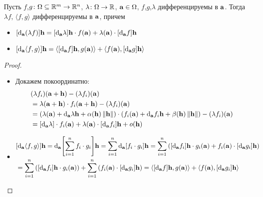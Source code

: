 \begin{theorem}

    Пусть $f$,$g \colon \Omega \subseteq \mathbb{R}^m \to \mathbb{R}^n$, $\lambda \colon \Omega \to
    \mathbb{R}$, $\mathbf{a} \in \Omega$, $f$,$g$,$\lambda$ дифференцируемы в $\mathbf{a}$. Тогда
    $\lambda f$, $\langle f, g \rangle$ дифференцируемы в $\mathbf{a}$, причем
    \begin{itemize}
        \item $[\mathrm{d}_{\mathbf{a}}{(\lambda f)}]\mathbf{h} =
        [\mathrm{d}_{\mathbf{a}}{\lambda}]\mathbf{h} \cdot f(\mathbf{a}) + \lambda(\mathbf{a}) \cdot
        [\mathrm{d}_{\mathbf{a}}{f}]\mathbf{h}$
        \item $[\mathrm{d}_{\mathbf{a}}{\langle f, g \rangle}]\mathbf{h} =
        \langle [\mathrm{d}_{\mathbf{a}}{f}]\mathbf{h}, g(\mathbf{a}) \rangle
        + \langle f(\mathbf{a}), [\mathrm{d}_{\mathbf{a}}{g}]\mathbf{h} \rangle$

    \end{itemize}
\end{theorem}
\begin{proof}
    \enewline
    \begin{itemize}
        \item Докажем покоординатно:
\begin{align*}
    & (\lambda f_i)(\mathbf{a} + \mathbf{h}) - (\lambda f_i)(\mathbf{a}) \\
    &= \lambda(\mathbf{a} + \mathbf{h}) \cdot f_i(\mathbf{a} + \mathbf{h}) - (\lambda f_i)(\mathbf{a}) \\
    &= (\lambda(\mathbf{a}) + \mathrm{d}_{\mathbf{a}}{\lambda}\mathbf{h} + \alpha(\mathbf{h})\left\lVert\mathbf{h}\right\rVert) \cdot
    (f_i(\mathbf{a}) + \mathrm{d}_{\mathbf{a}}{f_i}\mathbf{h} + \beta(\mathbf{h})\left\lVert\mathbf{h}\right\rVert) - (\lambda f_i)(\mathbf{a}) \\
    &= [\mathrm{d}_{\mathbf{a}}{\lambda}] \cdot f_i(\mathbf{a}) + \lambda(\mathbf{a}) \cdot
    [\mathrm{d}_{\mathbf{a}}{f_i}]\mathbf{h} + o(\mathbf{h})
\end{align*}
        \item
\begin{align*}
    & [\mathrm{d}_{\mathbf{a}}{\langle f, g \rangle}]\mathbf{h} = \mathrm{d}_{\mathbf{a}}{\left[\sum_{i =
    1}^n{f_i \cdot g_i}\right]}\mathbf{h} = \sum_{i =
    1}^n{\mathrm{d}_{\mathbf{a}}{\left[{f_i \cdot g_i}\right]}}\mathbf{h} =
    \sum_{i = 1}^{n}{\left([\mathrm{d}_{\mathbf{a}}{f_i}]\mathbf{h} \cdot g_i(\mathbf{a}) + f_i(\mathbf{a}) \cdot
    [\mathrm{d}_{\mathbf{a}}{g_i}]\mathbf{h}\right)} \\
    &= \sum_{i = 1}^{n}{\left([\mathrm{d}_{\mathbf{a}}{f_i}]\mathbf{h} \cdot g_i(\mathbf{a})\right)} +
    \sum_{i = 1}^{n}{\left(f_i(\mathbf{a}) \cdot [\mathrm{d}_{\mathbf{a}}{g_i}]\mathbf{h}\right)} =
    \langle [\mathrm{d}_{\mathbf{a}}{f}]\mathbf{h}, g(\mathbf{a}) \rangle + \langle f(\mathbf{a}),
    [\mathrm{d}_{\mathbf{a}}{g_i}]\mathbf{h} \rangle
\end{align*}
    \end{itemize}
\end{proof}

